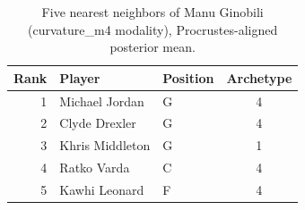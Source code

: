 \begin{table}[htbp]
  \centering\small
  \begin{tabular}{rllc}
    \toprule
    Rank & Player & Position & Archetype \\
    \midrule
    1 & Michael Jordan & G & 4 \\
    2 & Clyde Drexler & G & 4 \\
    3 & Khris Middleton & G & 1 \\
    4 & Ratko Varda & C & 4 \\
    5 & Kawhi Leonard & F & 4 \\
    \bottomrule
  \end{tabular}
  \caption{Five nearest neighbors of Manu Ginobili (curvature_m4 modality), Procrustes-aligned posterior mean.}
  \label{tab:Manu_Ginobili_neighbors_curvature_m4}
\end{table}

